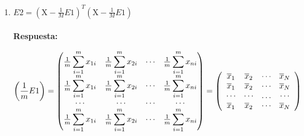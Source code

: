 \documentclass[12pt,a4paper]{article}
\begin{document}
\begin{enumerate}
\begin{enumerate}
		\item  $E 2=\left(\mathrm{X}-\frac{1}{M} E 1\right)^{T}\left(\mathrm{X}-\frac{1}{M} E 1\right)$\\\\\textbf{Respuesta:}\\
		{\scriptsize
\begin{equation}
\begin{split}
\begin{aligned}
\notag
		\left(\frac{1}{m} E 1\right) =   \begin{pmatrix}	
		\frac{1}{m} \displaystyle\sum_{i=1}^{m}x_{1 i}&\frac{1}{m} \displaystyle\sum_{i=1}^{m}x_{2 i}&\cdots&\frac{1}{m} \displaystyle\sum_{i=1}^{m}x_{n i}\\ 
		\frac{1}{m} \displaystyle\sum_{i=1}^{m}x_{1 i}&\frac{1}{m} \displaystyle\sum_{i=1}^{m}x_{2 i}&\cdots&\frac{1}{m} \displaystyle\sum_{i=1}^{m}x_{n i}\\ 
		\cdots & \cdots & \cdots & \cdots \\
		\frac{1}{m} \displaystyle\sum_{i=1}^{m}x_{1 i}&\frac{1}{m} \displaystyle\sum_{i=1}^{m}x_{2 i}&\cdots&\frac{1}{m} \displaystyle\sum_{i=1}^{m}x_{n i}
		\end{pmatrix} = \left( \begin{array}{cccc}{\overline{x}_{1}} & {\overline{x}_{2}} & {\cdots} & {\overline{x}_{N}} \\ {\overline{x}_{1}} & {\overline{x}_{2}} & {\cdots} & {\overline{x}_{N}} \\ {\cdots} & {\cdots} & {\ldots} & {\cdots} \\ {\overline{x}_{1}} & {\overline{x}_{2}} & {\cdots} & {\overline{x}_{N}}\end{array}\right)
\end{aligned}
\end{split}
\end{equation}

}
\end{enumerate}
\end{enumerate}
\end{document}
